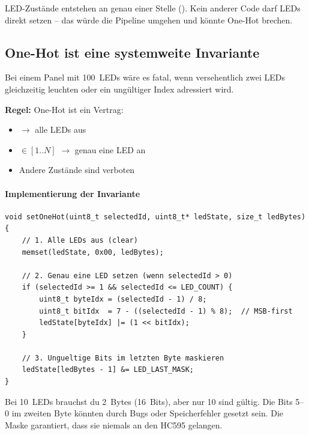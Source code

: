 \begin{warnbox}[Konsequenz]
LED-Zustände entstehen an genau einer Stelle (). Kein anderer Code
darf LEDs direkt setzen -- das würde die Pipeline umgehen und könnte One-Hot brechen.
\end{warnbox}

\subsection{One-Hot ist eine systemweite Invariante}
\label{subsec:one-hot}

Bei einem Panel mit 100~LEDs wäre es fatal, wenn versehentlich zwei LEDs gleichzeitig
leuchten oder ein ungültiger Index adressiert wird.

\textbf{Regel:} One-Hot ist ein Vertrag:
\begin{itemize}
  \item {} $\to$ alle LEDs aus
  \item {} $\in [1..N]$ $\to$ genau eine LED an
  \item Andere Zustände sind verboten
\end{itemize}

\paragraph{Implementierung der Invariante}

\begin{lstlisting}[style=arduino,caption={One-Hot Implementierung},label={lst:one-hot}]
void setOneHot(uint8_t selectedId, uint8_t* ledState, size_t ledBytes) {
    // 1. Alle LEDs aus (clear)
    memset(ledState, 0x00, ledBytes);

    // 2. Genau eine LED setzen (wenn selectedId > 0)
    if (selectedId >= 1 && selectedId <= LED_COUNT) {
        uint8_t byteIdx = (selectedId - 1) / 8;
        uint8_t bitIdx  = 7 - ((selectedId - 1) % 8);  // MSB-first
        ledState[byteIdx] |= (1 << bitIdx);
    }

    // 3. Ungueltige Bits im letzten Byte maskieren
    ledState[ledBytes - 1] &= LED_LAST_MASK;
}
\end{lstlisting}

\begin{infobox}
Bei 10~LEDs brauchst du 2~Bytes (16~Bits), aber nur 10 sind gültig. Die Bits 5--0
im zweiten Byte könnten durch Bugs oder Speicherfehler gesetzt sein. Die Maske
garantiert, dass sie niemals an den HC595 gelangen.
\end{infobox}

